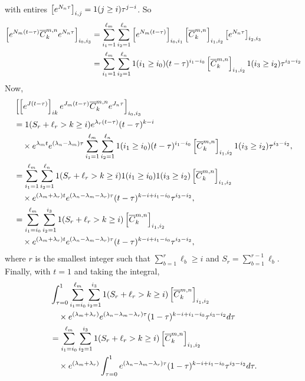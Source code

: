 \documentclass{article}
\begin{document}
with entires \(\left[e^{N_n\tau}\right]_{i,j}=1(j\geq i)\tau^{j-i}\).
So 
\begin{align}
    \left[e^{N_m(t-\tau)} \overline{C}_k^{m,n} e^{N_n\tau}\right]_{i_0,i_3} 
    &= \sum_{i_1=1}^{\ell_m}\sum_{i_2=1}^{\ell_n} \left[e^{N_m(t-\tau)}\right]_{i_0,i_1} \left[\overline{C}_k^{m,n}\right]_{i_1,i_2} \left[e^{N_n\tau}\right]_{i_2,i_3}
    \\&= \sum_{i_1=1}^{\ell_m}\sum_{i_2=1}^{\ell_n} 1(i_1\geq i_0)(t-\tau)^{i_1-i_0} \left[\overline{C}_k^{m,n}\right]_{i_1,i_2} 1(i_3\geq i_2)\tau^{i_3-i_2}
\end{align}
Now, 
\begin{align}
    &\left[\left[e^{J(t-\tau)}\right]_{ik} e^{J_m(t-\tau)} \overline{C}_k^{m,n} e^{J_n\tau} \right]_{i_0,i_3}
    \\&= 1(S_r+\ell_{r}> k\geq i)e^{\lambda_r (t-\tau)}(t-\tau)^{k-i}
    \\&\quad\times e^{\lambda_m t}e^{(\lambda_n-\lambda_m)\tau}\sum_{i_1=1}^{\ell_m}\sum_{i_2=1}^{\ell_n} 1(i_1\geq i_0)(t-\tau)^{i_1-i_0} \left[\overline{C}_k^{m,n}\right]_{i_1,i_2} 1(i_3\geq i_2)\tau^{i_3-i_2},
    \\&= \sum_{i_1=1}^{\ell_m}\sum_{i_2=1}^{\ell_n}1(S_r+\ell_{r}> k\geq i)1(i_1\geq i_0)1(i_3\geq i_2)\left[\overline{C}_k^{m,n}\right]_{i_1,i_2}
    \\&\quad\times e^{(\lambda_m+\lambda_r) t}e^{(\lambda_n-\lambda_m-\lambda_r)\tau} (t-\tau)^{k-i+i_1-i_0}\tau^{i_3-i_2} ,
    \\&= \sum_{i_1=i_0}^{\ell_m}\sum_{i_2=1}^{i_3}1(S_r+\ell_{r}> k\geq i)\left[\overline{C}_k^{m,n}\right]_{i_1,i_2}
    \\&\quad\times e^{(\lambda_m+\lambda_r) t}e^{(\lambda_n-\lambda_m-\lambda_r)\tau} (t-\tau)^{k-i+i_1-i_0}\tau^{i_3-i_2},
\end{align}
where \(r\) is the smallest integer such that \(\displaystyle \sum_{b=1}^r \ell_b \geq i\) and \(S_r = \sum_{b=1}^{r-1} \ell_b\). Finally, with \(t=1\) and taking the integral, 
\begin{align}
    &\int_{\tau=0}^1\sum_{i_1=i_0}^{\ell_m}\sum_{i_2=1}^{i_3}1(S_r+\ell_{r}> k\geq i)\left[\overline{C}_k^{m,n}\right]_{i_1,i_2}
    \\&\quad\times e^{(\lambda_m+\lambda_r)}e^{(\lambda_n-\lambda_m-\lambda_r)\tau} (1-\tau)^{k-i+i_1-i_0}\tau^{i_3-i_2}d\tau
    \\&=\sum_{i_1=i_0}^{\ell_m}\sum_{i_2=1}^{i_3}1(S_r+\ell_{r}> k\geq i)\left[\overline{C}_k^{m,n}\right]_{i_1,i_2}
    \\&\quad\times e^{(\lambda_m+\lambda_r)}\int_{\tau=0}^1e^{(\lambda_n-\lambda_m-\lambda_r)\tau} (1-\tau)^{k-i+i_1-i_0}\tau^{i_3-i_2}d\tau.
\end{align}
\end{document}
